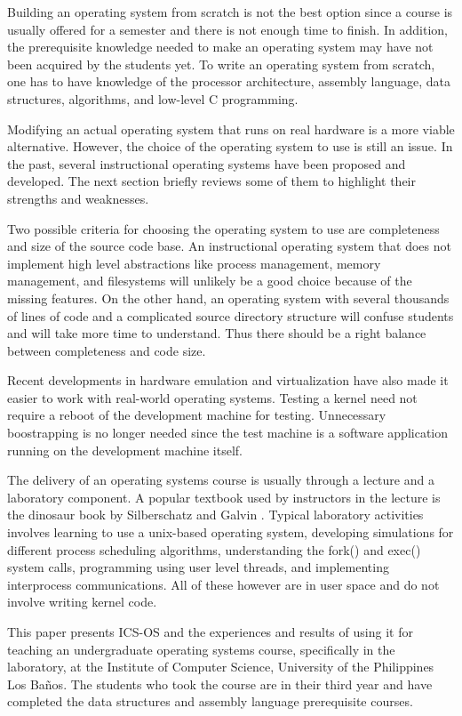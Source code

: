 \documentclass{acm_proc_article-sp}
\begin{document}
Building an operating system from scratch is not the best option since a course
is usually offered for a semester and there is not enough time to finish. In 
addition, the prerequisite knowledge needed to make an operating system may have
not been acquired by the students yet. To write an operating system from 
scratch, one has to have knowledge of the processor architecture, assembly
language, data structures, algorithms, and low-level C programming.

Modifying an actual operating system that runs on real hardware is a more
viable alternative. However, the choice of the operating system to use is
still an issue. In the past, several instructional operating systems have been
proposed and developed. The next section briefly reviews some of them 
to highlight their strengths and weaknesses.

Two possible criteria for choosing the operating system to use are completeness 
and size of the source code base. An instructional operating system that does
not implement high level abstractions like process management, memory 
management, and filesystems will unlikely be a good choice because
of the missing features. On the other hand, an operating system with several 
thousands of lines of code and a complicated source directory structure will
confuse students and will take more time to understand. Thus there should
be a right balance between completeness and code size.

Recent developments in hardware emulation and virtualization have also made it 
easier to work with real-world operating systems. Testing a kernel need not
require a reboot of the development machine for testing. Unnecessary 
boostrapping is no longer needed since the test machine is a software
application running on the development machine itself.
 
The delivery of an operating systems course is usually through a
lecture and a laboratory component. A popular textbook used by instructors in
the lecture is the dinosaur book by Silberschatz and Galvin 
\cite{silberschatz:osc}. Typical laboratory activities involves learning to 
use a unix-based operating system, developing simulations for different process
scheduling algorithms, understanding the fork() and exec() system calls, 
programming using user level threads, and implementing interprocess
communications. All of these however are in user space and do not involve 
writing kernel code.

This paper presents ICS-OS and the experiences and results of using it for 
teaching an undergraduate operating systems course, specifically in the
laboratory, at the Institute of Computer Science, University of the Philippines
Los Ba\~nos. The students who took the course are in their third year and
have completed the data structures and assembly language prerequisite courses.
\end{document}
